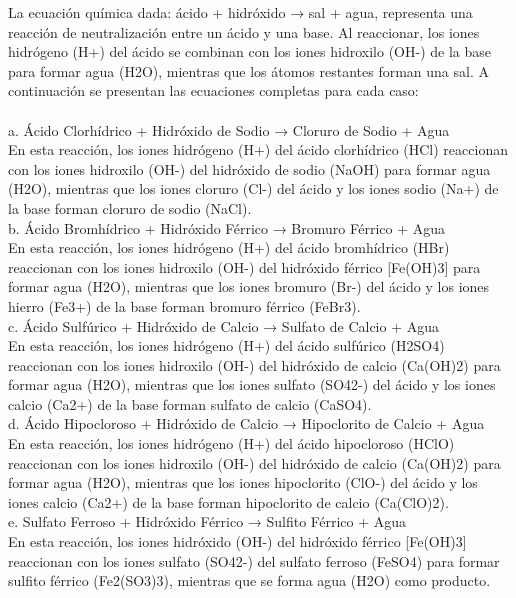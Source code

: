 \documentclass{article}
\begin{document}
La ecuación química dada: ácido + hidróxido → sal + agua, representa una reacción de neutralización entre un ácido y una base. Al reaccionar, los iones hidrógeno (H+) del ácido se combinan con los iones hidroxilo (OH-) de la base para formar agua (H2O), mientras que los átomos restantes forman una sal. A continuación se presentan las ecuaciones completas para cada caso:\\
\\
a. Ácido Clorhídrico + Hidróxido de Sodio → Cloruro de Sodio + Agua\\
En esta reacción, los iones hidrógeno (H+) del ácido clorhídrico (HCl) reaccionan con los iones hidroxilo (OH-) del hidróxido de sodio (NaOH) para formar agua (H2O), mientras que los iones cloruro (Cl-) del ácido y los iones sodio (Na+) de la base forman cloruro de sodio (NaCl).\\
b. Ácido Bromhídrico + Hidróxido Férrico → Bromuro Férrico + Agua\\
En esta reacción, los iones hidrógeno (H+) del ácido bromhídrico (HBr) reaccionan con los iones hidroxilo (OH-) del hidróxido férrico [Fe(OH)3] para formar agua (H2O), mientras que los iones bromuro (Br-) del ácido y los iones hierro (Fe3+) de la base forman bromuro férrico (FeBr3).\\
c. Ácido Sulfúrico + Hidróxido de Calcio → Sulfato de Calcio + Agua\\
En esta reacción, los iones hidrógeno (H+) del ácido sulfúrico (H2SO4) reaccionan con los iones hidroxilo (OH-) del hidróxido de calcio (Ca(OH)2) para formar agua (H2O), mientras que los iones sulfato (SO42-) del ácido y los iones calcio (Ca2+) de la base forman sulfato de calcio (CaSO4).\\
d. Ácido Hipocloroso + Hidróxido de Calcio → Hipoclorito de Calcio + Agua\\
En esta reacción, los iones hidrógeno (H+) del ácido hipocloroso (HClO) reaccionan con los iones hidroxilo (OH-) del hidróxido de calcio (Ca(OH)2) para formar agua (H2O), mientras que los iones hipoclorito (ClO-) del ácido y los iones calcio (Ca2+) de la base forman hipoclorito de calcio (Ca(ClO)2).\\
e. Sulfato Ferroso + Hidróxido Férrico → Sulfito Férrico + Agua\\
En esta reacción, los iones hidróxido (OH-) del hidróxido férrico [Fe(OH)3] reaccionan con los iones sulfato (SO42-) del sulfato ferroso (FeSO4) para formar sulfito férrico (Fe2(SO3)3), mientras que se forma agua (H2O) como producto.\\
\end{document}
